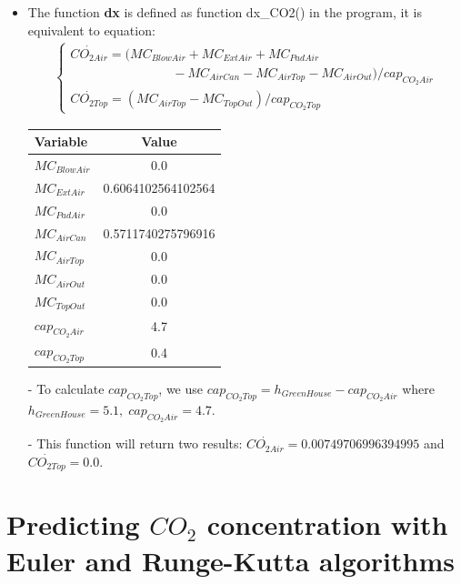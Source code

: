 \documentclass[a4paper]{article}
\begin{document}
\begin{itemize}
  \item The function \textbf{dx} is defined as function dx\_CO2() in the program, it is equivalent to equation:
        \begin{align*}
          \begin{cases}
            \dot{CO_{2Air}} = (MC_{BlowAir} + MC_{ExtAir} + MC_{PadAir} \\ \qquad \qquad \qquad \qquad
            - MC_{AirCan} - MC_{AirTop} - MC_{AirOut}) / cap_{CO_2Air}  \\
            \dot{CO_{2Top}} = (MC_{AirTop} - MC_{TopOut}) / cap_{CO_2Top}
          \end{cases}
        \end{align*}

        \begin{table}[H]
          \centering
          \begin{tabular}{@{}lS[table-format=1.17]@{}}
            \toprule
            \textbf{Variable} & \textbf{Value}     \\
            \midrule
            \(MC_{BlowAir}\)  & 0.0                \\
            \(MC_{ExtAir}\)   & 0.6064102564102564 \\
            \(MC_{PadAir}\)   & 0.0                \\
            \(MC_{AirCan}\)   & 0.5711740275796916 \\
            \(MC_{AirTop}\)   & 0.0                \\
            \(MC_{AirOut}\)   & 0.0                \\
            \(MC_{TopOut}\)   & 0.0                \\
            \(cap_{CO_2Air}\) & 4.7                \\
            \(cap_{CO_2Top}\) & 0.4                \\
            \bottomrule
          \end{tabular}
        \end{table}
  \item[-] To calculate \(cap_{CO_2Top}\), we use \(cap_{CO_2Top} = h_{GreenHouse} - cap_{CO_2Air}\) where \(h_{GreenHouse} = 5.1,\; cap_{CO_2Air} = 4.7\).
  \item[-] This function will return two results: \(\dot{CO_{2Air}} = 0.00749706996394995\) and \(\dot{CO_{2Top}} = 0.0\).

\end{itemize}
\newpage
\section{Predicting \texorpdfstring{\(CO_2\)}{} concentration with Euler and Runge-Kutta algorithms}
\end{document}
